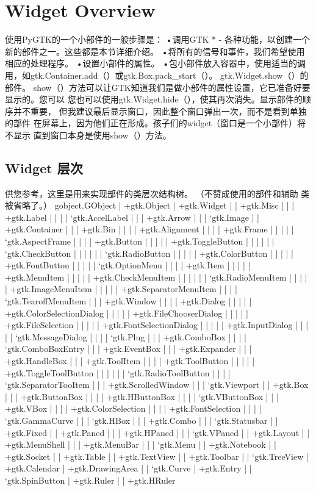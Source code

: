 \chapter{Widget Overview}
使用PyGTK的一个小部件的一般步骤是：
•调用GTK *  - 各种功能，以创建一个新的部件之一。这些都是本节详细介绍。
•将所有的信号和事件，我们希望使用相应的处理程序。
•设置小部件的属性。
•包小部件放入容器中，使用适当的调用，如gtk.Container.add（）或gtk.Box.pack_start（）。
gtk.Widget.show（）的部件。
show（）方法可以让GTK知道我们是做小部件的属性设置，它已准备好要显示的。您可以
您也可以使用gtk.Widget.hide（），使其再次消失。显示部件的顺序并不重要，
但我建议最后显示窗口，因此整个窗口弹出一次，而不是看到单独的部件
在屏幕上，因为他们正在形成。孩子们的widget（窗口是一个小部件）将不显示
直到窗口本身是使用show（）方法。

\section{Widget 层次}
供您参考，这里是用来实现部件的类层次结构树。 （不赞成使用的部件和辅助
类被省略了。）	
gobject.GObject
|
+gtk.Object
| +gtk.Widget
| | +gtk.Misc
| | | +gtk.Label
| | | | ‘gtk.AccelLabel
| | | +gtk.Arrow
| | | ‘gtk.Image
| | +gtk.Container
| | | +gtk.Bin
| | | | +gtk.Alignment
| | | | +gtk.Frame
| | | | | ‘gtk.AspectFrame
| | | | +gtk.Button
| | | | | +gtk.ToggleButton
| | | | | | ‘gtk.CheckButton
| | | | | | ‘gtk.RadioButton
| | | | | +gtk.ColorButton
| | | | | +gtk.FontButton
| | | | | ‘gtk.OptionMenu
| | | | +gtk.Item
| | | | | +gtk.MenuItem
| | | | | +gtk.CheckMenuItem
| | | | | | ‘gtk.RadioMenuItem
| | | | | +gtk.ImageMenuItem
| | | | | +gtk.SeparatorMenuItem
| | | | ‘gtk.TearoffMenuItem
| | | +gtk.Window
| | | | +gtk.Dialog
| | | | | +gtk.ColorSelectionDialog
| | | | | +gtk.FileChooserDialog
| | | | | +gtk.FileSelection
| | | | | +gtk.FontSelectionDialog
| | | | | +gtk.InputDialog
| | | | | ‘gtk.MessageDialog
| | | | ‘gtk.Plug
| | | +gtk.ComboBox
| | | | ‘gtk.ComboBoxEntry
| | | +gtk.EventBox
| | | +gtk.Expander
| | | +gtk.HandleBox
| | | +gtk.ToolItem
| | | | +gtk.ToolButton
| | | | | +gtk.ToggleToolButton
| | | | | | ‘gtk.RadioToolButton
| | | | ‘gtk.SeparatorTooItem
| | | +gtk.ScrolledWindow
| | | ‘gtk.Viewport
| | +gtk.Box
| | | +gtk.ButtonBox
| | | | +gtk.HButtonBox
| | | | ‘gtk.VButtonBox
| | | +gtk.VBox
| | | | +gtk.ColorSelection
| | | | +gtk.FontSelection
| | | | ‘gtk.GammaCurve
| | | ‘gtk.HBox
| | | +gtk.Combo
| | | ‘gtk.Statusbar
| | +gtk.Fixed
| | +gtk.Paned
| | | +gtk.HPaned
| | | ‘gtk.VPaned
| | +gtk.Layout
| | +gtk.MenuShell
| | | +gtk.MenuBar
| | | ‘gtk.Menu
| | +gtk.Notebook
| | +gtk.Socket
| | +gtk.Table
| | +gtk.TextView
| | +gtk.Toolbar
| | ‘gtk.TreeView
| +gtk.Calendar
| +gtk.DrawingArea
| | ‘gtk.Curve
| +gtk.Entry
| | ‘gtk.SpinButton
| +gtk.Ruler
| | +gtk.HRuler

